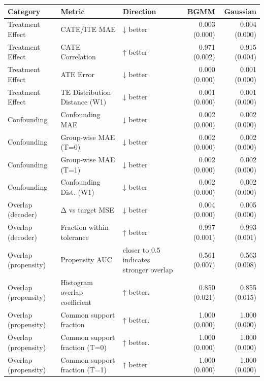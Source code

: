 \begin{tabular}{lllrr}
\toprule
            Category &                        Metric &                                Direction &          BGMM &      Gaussian \\
\midrule
    Treatment Effect &                  CATE/ITE MAE &                                 ↓ better & 0.003 (0.000) & 0.004 (0.000) \\
    Treatment Effect &              CATE Correlation &                                 ↑ better & 0.971 (0.002) & 0.915 (0.004) \\
    Treatment Effect &                     ATE Error &                                 ↓ better & 0.000 (0.000) & 0.001 (0.000) \\
    Treatment Effect & TE Distribution Distance (W1) &                                 ↓ better & 0.001 (0.000) & 0.001 (0.000) \\
         Confounding &               Confounding MAE &                                 ↓ better & 0.002 (0.000) & 0.002 (0.000) \\
         Confounding &          Group-wise MAE (T=0) &                                 ↓ better & 0.002 (0.000) & 0.002 (0.000) \\
         Confounding &          Group-wise MAE (T=1) &                                 ↓ better & 0.002 (0.000) & 0.002 (0.000) \\
         Confounding &        Confounding Dist. (W1) &                                 ↓ better & 0.002 (0.000) & 0.002 (0.000) \\
   Overlap (decoder) &               Δ vs target MSE &                                 ↓ better & 0.004 (0.000) & 0.005 (0.000) \\
   Overlap (decoder) &     Fraction within tolerance &                                 ↑ better & 0.997 (0.001) & 0.993 (0.001) \\
Overlap (propensity) &                Propensity AUC & closer to 0.5 indicates stronger overlap & 0.561 (0.007) & 0.563 (0.008) \\
Overlap (propensity) & Histogram overlap coefficient &                                ↑ better. & 0.850 (0.021) & 0.855 (0.015) \\
Overlap (propensity) &       Common support fraction &                                ↑ better. & 1.000 (0.000) & 1.000 (0.000) \\
Overlap (propensity) & Common support fraction (T=0) &                                ↑ better. & 1.000 (0.000) & 1.000 (0.000) \\
Overlap (propensity) & Common support fraction (T=1) &                                 ↑ better & 1.000 (0.000) & 1.000 (0.000) \\
\bottomrule
\end{tabular}
